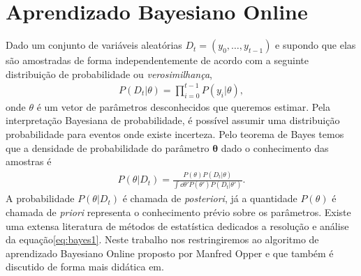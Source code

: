 \section{Aprendizado Bayesiano Online} %
\label{sec:apbayes}

Dado um conjunto de variáveis aleatórias  $D_t = \left( y_0,\ldots,y_{t-1}
\right)$ e supondo que elas são amostradas de forma independentemente de acordo
com a seguinte distribuição de probabilidade ou \textit{verosimilhança},
\begin{align}
    P(D_t|\theta) = \prod_{i=0}^{t-1} P(y_i|\theta),
\end{align}
onde $\theta$ é um vetor de parâmetros desconhecidos que queremos estimar. 
Pela interpretação Bayesiana de probabilidade, é possível assumir uma
distribuição probabilidade para eventos onde existe incerteza.
Pelo teorema de Bayes temos que a densidade de probabilidade do parâmetro $\bm
\theta$ dado o conhecimento das amostras é
\begin{align}
    P(\theta|D_t) = \frac{P(\theta)P(D_t|\theta)}
        {\int \dd \theta' P(\theta')P(D_t|\theta')}.
        \label{eq:bayes1}
\end{align}
A probabilidade $P(\theta|D_t)$ é chamada de \textit{posteriori},
já  a quantidade $P(\theta)$ é chamada de \textit{priori} representa
o conhecimento prévio sobre os parâmetros. Existe uma extensa
literatura\cite{DeGroot1989} de métodos de estatística dedicados a resolução
e análise da equação\ref{eq:bayes1}. Neste trabalho nos restringiremos
ao algoritmo de aprendizado Bayesiano Online proposto por Manfred
Opper e que também é discutido de forma mais didática
em\citep{Opper1998,Solla1998}.

